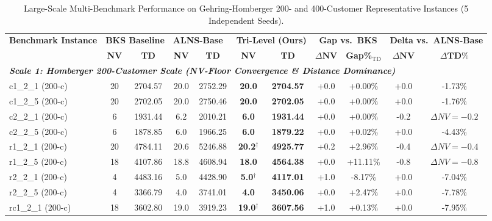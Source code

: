 \documentclass{ieeeaccess}
\begin{document}
\begin{table}[!t]
\caption{Large-Scale Multi-Benchmark Performance on Gehring-Homberger 200- and 400-Customer Representative Instances (5 Independent Seeds).}
\label{tab:homberger_scale_benchmark}
\centering
\scriptsize
\setlength{\tabcolsep}{2.0pt}
\begin{tabular*}{\textwidth}{@{\extracolsep{\fill}} l cc cc cc cc cc @{}}
\toprule
\multirow{2}{*}{\textbf{Benchmark Instance}} & \multicolumn{2}{c}{\textbf{BKS Baseline}} & \multicolumn{2}{c}{\textbf{ALNS-Base~\cite{Ropke2006}}} & \multicolumn{2}{c}{\textbf{Tri-Level (Ours)}} & \multicolumn{2}{c}{\textbf{Gap vs.\ BKS}} & \multicolumn{2}{c}{\textbf{Delta vs.\ ALNS-Base}} \\
\cmidrule(lr){2-3} \cmidrule(lr){4-5} \cmidrule(lr){6-7} \cmidrule(lr){8-9} \cmidrule(lr){10-11}
 & \textbf{NV} & \textbf{TD} & \textbf{NV} & \textbf{TD} & \textbf{NV} & \textbf{TD} & $\Delta\textbf{NV}$ & \textbf{Gap\%}$_{\text{TD}}$ & $\Delta\textbf{NV}$ & $\Delta\textbf{TD}\%$ \\
\midrule
\multicolumn{11}{l}{\textit{\textbf{Scale 1: Homberger 200-Customer Scale (NV-Floor Convergence \& Distance Dominance)}}} \\
c1\_2\_1 (200-c) & 20 & 2704.57 & 20.0 & 2752.29 & \textbf{20.0} & \textbf{2704.57} & +0.0 & +0.00\% & +0.0 & -1.73\% \\
c1\_2\_5 (200-c) & 20 & 2702.05 & 20.0 & 2750.46 & \textbf{20.0} & \textbf{2702.05} & +0.0 & +0.00\% & +0.0 & -1.76\% \\
c2\_2\_1 (200-c) & 6 & 1931.44 & 6.2 & 2010.21 & \textbf{6.0} & \textbf{1931.44} & +0.0 & +0.00\% & -0.2 & $\Delta NV=-0.2$ \\
c2\_2\_5 (200-c) & 6 & 1878.85 & 6.0 & 1966.25 & \textbf{6.0} & \textbf{1879.22} & +0.0 & +0.02\% & +0.0 & -4.43\% \\
r1\_2\_1 (200-c) & 20 & 4784.11 & 20.6 & 5246.88 & \textbf{20.2}$^\dagger$ & \textbf{4925.77} & +0.2 & +2.96\% & -0.4 & $\Delta NV=-0.4$ \\
r1\_2\_5 (200-c) & 18 & 4107.86 & 18.8 & 4608.94 & \textbf{18.0} & \textbf{4564.38} & +0.0 & +11.11\% & -0.8 & $\Delta NV=-0.8$ \\
r2\_2\_1 (200-c) & 4 & 4483.16 & 5.0 & 4428.90 & \textbf{5.0}$^\dagger$ & \textbf{4117.01} & +1.0 & -8.17\% & +0.0 & -7.04\% \\
r2\_2\_5 (200-c) & 4 & 3366.79 & 4.0 & 3741.01 & \textbf{4.0} & \textbf{3450.06} & +0.0 & +2.47\% & +0.0 & -7.78\% \\
rc1\_2\_1 (200-c) & 18 & 3602.80 & 19.0 & 3919.23 & \textbf{19.0}$^\dagger$ & \textbf{3607.56} & +1.0 & +0.13\% & +0.0 & -7.95\% \\

\end{tabular*}
\end{table}
\end{document}
